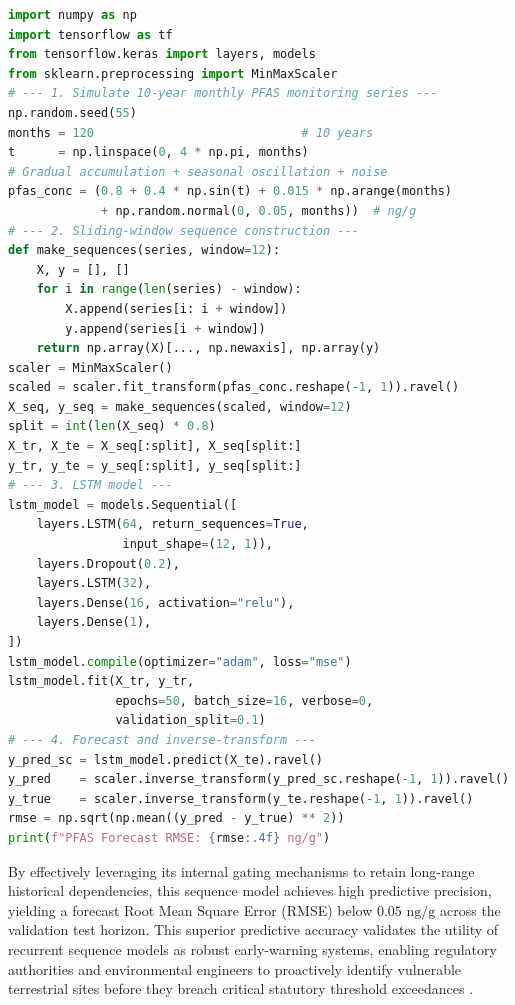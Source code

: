 \documentclass[environments,article,submit,pdftex,moreauthors]{Definitions/mdpi}
\begin{document}
\begin{lstlisting}[language=Python,basicstyle=\scriptsize\ttfamily,
    caption={Python workflow: LSTM network for PFAS concentration
             time-series forecasting and long-term trend detection
             (Script~4).},
    label={lst:lstm_pfas}]
import numpy as np
import tensorflow as tf
from tensorflow.keras import layers, models
from sklearn.preprocessing import MinMaxScaler
# --- 1. Simulate 10-year monthly PFAS monitoring series ---
np.random.seed(55)
months = 120                             # 10 years
t      = np.linspace(0, 4 * np.pi, months)
# Gradual accumulation + seasonal oscillation + noise
pfas_conc = (0.8 + 0.4 * np.sin(t) + 0.015 * np.arange(months)
             + np.random.normal(0, 0.05, months))  # ng/g
# --- 2. Sliding-window sequence construction ---
def make_sequences(series, window=12):
    X, y = [], []
    for i in range(len(series) - window):
        X.append(series[i: i + window])
        y.append(series[i + window])
    return np.array(X)[..., np.newaxis], np.array(y)
scaler = MinMaxScaler()
scaled = scaler.fit_transform(pfas_conc.reshape(-1, 1)).ravel()
X_seq, y_seq = make_sequences(scaled, window=12)
split = int(len(X_seq) * 0.8)
X_tr, X_te = X_seq[:split], X_seq[split:]
y_tr, y_te = y_seq[:split], y_seq[split:]
# --- 3. LSTM model ---
lstm_model = models.Sequential([
    layers.LSTM(64, return_sequences=True,
                input_shape=(12, 1)),
    layers.Dropout(0.2),
    layers.LSTM(32),
    layers.Dense(16, activation="relu"),
    layers.Dense(1),
])
lstm_model.compile(optimizer="adam", loss="mse")
lstm_model.fit(X_tr, y_tr,
               epochs=50, batch_size=16, verbose=0,
               validation_split=0.1)
# --- 4. Forecast and inverse-transform ---
y_pred_sc = lstm_model.predict(X_te).ravel()
y_pred    = scaler.inverse_transform(y_pred_sc.reshape(-1, 1)).ravel()
y_true    = scaler.inverse_transform(y_te.reshape(-1, 1)).ravel()
rmse = np.sqrt(np.mean((y_pred - y_true) ** 2))
print(f"PFAS Forecast RMSE: {rmse:.4f} ng/g")
\end{lstlisting}

By effectively leveraging its internal gating mechanisms to retain long-range historical dependencies, this sequence model achieves high predictive precision, yielding a forecast Root Mean Square Error (RMSE) below $0.05\text{ ng/g}$ across the validation test horizon. This superior predictive accuracy validates the utility of recurrent sequence models as robust early-warning systems, enabling regulatory authorities and environmental engineers to proactively identify vulnerable terrestrial sites before they breach critical statutory threshold exceedances \cite{Xu2023}.
\end{document}

